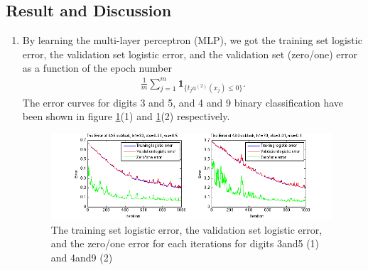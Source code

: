 \subsection{Result and Discussion}
\begin{enumerate}
\item By learning the multi-layer perceptron (MLP), we got the training set logistic error, the validation set logistic error, and the validation set (zero/one) error as a function of the epoch number
\begin{align}
\frac{1}{m}\sum_{j=1}^{m} \mathbf{1}_{\{t_{j} a^{(2)}(x_j)\le{0}\}}. 
\end{align}
The error curves for digits 3 and 5, and 4 and 9 binary classification have been shown in figure \ref{fig:3error}(1) and \ref{fig:3error}(2) respectively.

	\begin{figure}[htbp]
		\centering
		\includegraphics[width=0.99\textwidth]{plots/3error.png}
		\caption{The training set logistic error, the validation set logistic error, and the zero/one error for each iterations for digits 3and5 (1) and 4and9 (2)}
		\label{fig:3error}
	\end{figure}
	

\end{enumerate}
